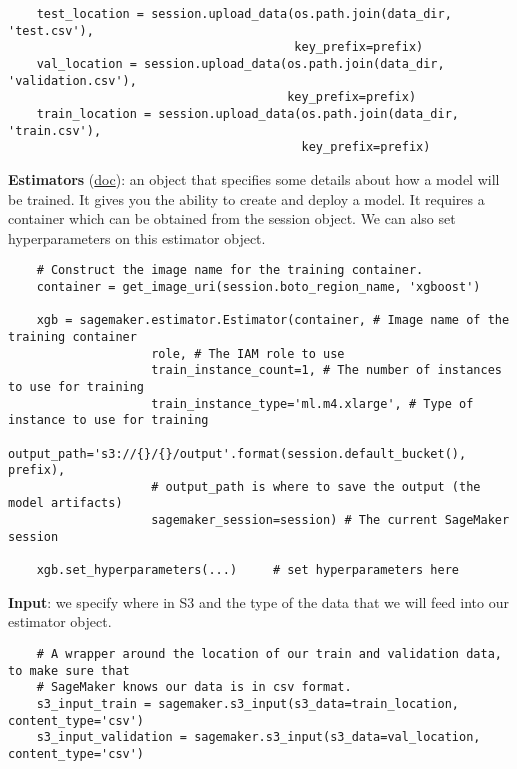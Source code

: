 \documentclass[11pt, a4paper]{article}
\begin{document}
\begin{spacing}{1.1}
\begin{lstlisting}
	test_location = session.upload_data(os.path.join(data_dir, 'test.csv'), 
	                                    key_prefix=prefix)
	val_location = session.upload_data(os.path.join(data_dir, 'validation.csv'), 
	                                   key_prefix=prefix)
	train_location = session.upload_data(os.path.join(data_dir, 'train.csv'), 
	                                     key_prefix=prefix)	
    \end{lstlisting}\vspace*{2mm}
	\textbf{Estimators} (\href{https://sagemaker.readthedocs.io/en/latest/estimators.html}{doc}): an object that specifies some details about how a model will be trained. It gives you the ability to create and deploy a model. It requires a container which can be obtained from the session object. We can also set hyperparameters on this estimator object. 
	\begin{lstlisting}
	# Construct the image name for the training container.
	container = get_image_uri(session.boto_region_name, 'xgboost')

	xgb = sagemaker.estimator.Estimator(container, # Image name of the training container
					role, # The IAM role to use
					train_instance_count=1, # The number of instances to use for training
					train_instance_type='ml.m4.xlarge', # Type of instance to use for training
					output_path='s3://{}/{}/output'.format(session.default_bucket(), prefix),
					# output_path is where to save the output (the model artifacts)
					sagemaker_session=session) # The current SageMaker session
	
	xgb.set_hyperparameters(...)	 # set hyperparameters here			
	\end{lstlisting}\vspace*{2mm}
	\textbf{Input}: we specify where in S3 and the type of the data that we will feed into our estimator object.
	\begin{lstlisting}
	# A wrapper around the location of our train and validation data, to make sure that
	# SageMaker knows our data is in csv format.
	s3_input_train = sagemaker.s3_input(s3_data=train_location, content_type='csv')
	s3_input_validation = sagemaker.s3_input(s3_data=val_location, content_type='csv')
	

\end{lstlisting}
\end{spacing}
\end{document}
